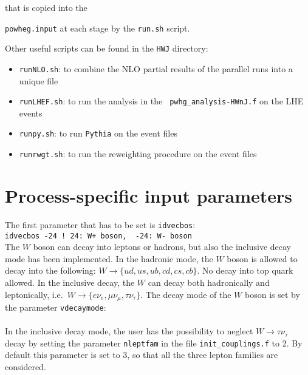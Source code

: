 \documentclass[paper]{JHEP3}
\begin{document}
that is copied into the {{\tt powheg.input} at each stage by the {\tt run.sh}
  script.

Other useful scripts can be found in the {\tt HWJ} directory:
\begin{itemize}
\item {\tt runNLO.sh}: to combine the NLO partial results of the parallel
  runs into a unique file

\item {\tt runLHEF.sh}: to run the analysis in the {\tt
  pwhg\_analysis-HWnJ.f} on the LHE events

\item {\tt runpy.sh}: to run {\tt Pythia} on the event files

\item {\tt runrwgt.sh}: to run the reweighting procedure on the event files

\end{itemize}




\section{Process-specific input parameters}


The first parameter that has to be set is {\tt idvecbos}:\\
{\tt idvecbos -24 \quad \qquad ! 24: W+ boson, \   -24: W- boson}\\

\noindent The $W$ boson can decay into leptons or hadrons, but also the
inclusive decay mode has been implemented.  In the hadronic mode, the $W$
boson is allowed to decay into the following: $W \to \{ ud, us, ub, cd, cs,
cb\}$. No decay into top quark allowed. 
In the inclusive decay, the $W$ can decay both hadronically and leptonically,
i.e.~$W \to \{e \nu_e, \mu \nu_\mu, \tau \nu_\tau\}$.  
The decay mode of the $W$ boson is set by the
parameter {\tt vdecaymode}:\\
\\

\noindent In the inclusive decay mode, the user has the possibility to
neglect $W \to \tau\nu_\tau$ decay by setting the parameter {\tt nleptfam}
in the file {\tt init\_couplings.f} to 2. By default this parameter is set to
3, so that all the three lepton families are considered.\\

}
\end{document}
